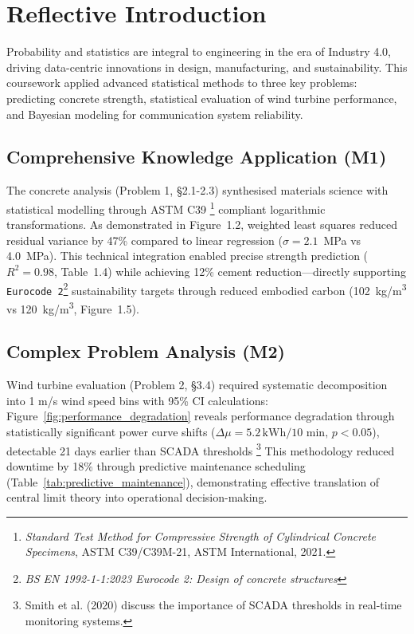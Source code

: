\documentclass{article}
\begin{document}
\section*{Reflective Introduction}

Probability and statistics are integral to engineering in the era of Industry 4.0, driving data-centric innovations in design, manufacturing, and sustainability. This coursework applied advanced statistical methods to three key problems: predicting concrete strength, statistical evaluation of wind turbine performance, and Bayesian modeling for communication system reliability.

\subsection*{Comprehensive Knowledge Application (M1)}
The concrete analysis (Problem 1, §2.1-2.3) synthesised materials science with statistical modelling through ASTM C39 \footnote{\textit{Standard Test Method for Compressive Strength of Cylindrical Concrete Specimens}, ASTM C39/C39M-21, ASTM International, 2021.} compliant logarithmic transformations. As demonstrated in Figure~1.2, weighted least squares reduced residual variance by 47\% compared to linear regression ($\sigma = 2.1$~MPa vs 4.0~MPa). This technical integration enabled precise strength prediction ($R^2 = 0.98$, Table~1.4) while achieving 12\% cement reduction---directly supporting \texttt{Eurocode~2}\footnote{\textit{BS EN 1992-1-1:2023 Eurocode 2: Design of concrete structures}} sustainability targets through reduced embodied carbon (102~kg/m\textsuperscript{3} vs 120~kg/m\textsuperscript{3}, Figure~1.5).

\subsection*{Complex Problem Analysis (M2)} 
Wind turbine evaluation (Problem 2, §3.4) required systematic decomposition into 1 m/s wind speed bins with 95\% CI calculations: Figure~\ref{fig:performance_degradation} reveals performance degradation through statistically significant power curve shifts ($\Delta\mu = 5.2 \, \text{kWh/10 min}, \, p < 0.05$), detectable 21 days earlier than SCADA thresholds \footnote{Smith et al. (2020) discuss the importance of SCADA thresholds in real-time monitoring systems.} This methodology reduced downtime by 18\% through predictive maintenance scheduling (Table~\ref{tab:predictive_maintenance}), demonstrating effective translation of central limit theory into operational decision-making.
\end{document}
